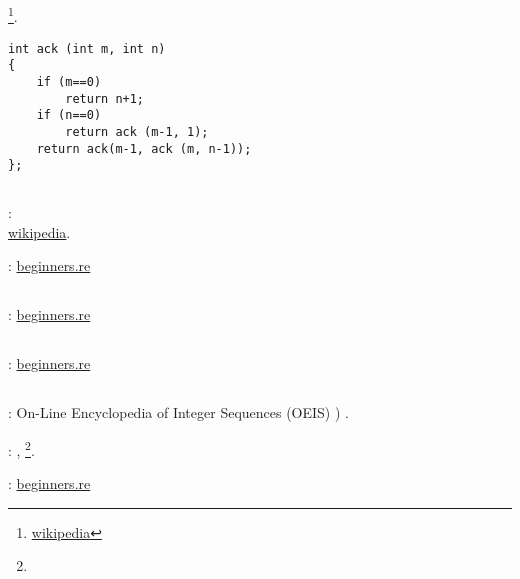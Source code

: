 \subsection{}

\footnote{\href{http://go.yurichev.com/17001}{wikipedia}}.

\begin{lstlisting}
int ack (int m, int n)
{
	if (m==0)
		return n+1;
	if (n==0)
		return ack (m-1, 1);
	return ack(m-1, ack (m, n-1));
};
\end{lstlisting}

\subsection{}

:\\
\href{http://go.yurichev.com/17002}{wikipedia}.

\Sourcecode: \href{http://go.yurichev.com/17152}{beginners.re}

\subsection{}

\Sourcecode: \href{http://go.yurichev.com/17153}{beginners.re}

\subsection{}

\Sourcecode: \href{http://go.yurichev.com/17154}{beginners.re}

\subsection{}

: On-Line Encyclopedia of Integer Sequences (OEIS) ) .

:  , \footnote{}.

\Sourcecode: \href{http://go.yurichev.com/17155}{beginners.re}

